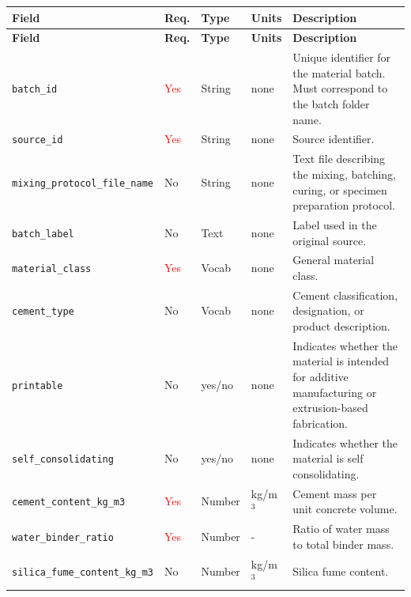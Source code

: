 \documentclass[11pt]{book}
\begin{document}
\small
\begin{longtable}{p{}p{}p{}p{}p{}}

\textbf{Field} & \textbf{Req.} & \textbf{Type} & \textbf{Units} & \textbf{Description} \\
\hline
\endfirsthead

\textbf{Field} & \textbf{Req.} & \textbf{Type} & \textbf{Units} & \textbf{Description} \\
\hline
\endhead

\texttt{batch\_id} & \textcolor{red}{Yes} & String & none & Unique identifier for the material batch. Must correspond to the batch folder name. \\

\texttt{source\_id} & \textcolor{red}{Yes} & String & none & Source identifier. \\

\texttt{mixing\_protocol\_file\_name} & No & String & none & Text file describing the mixing, batching, curing, or specimen preparation protocol. \\

\texttt{batch\_label} & No & Text & none & Label used in the original source. \\

\texttt{material\_class} & \textcolor{red}{Yes} & Vocab & none & General material class. \\

\texttt{cement\_type} & No & Vocab & none & Cement classification, designation, or product description. \\

\texttt{printable} & No & yes/no & none & Indicates whether the material is intended for additive manufacturing or extrusion-based fabrication. \\

\texttt{self\_consolidating} & No & yes/no & none & Indicates whether the material is self consolidating. \\

\texttt{cement\_content\_kg\_m3} & \textcolor{red}{Yes} & Number & kg/m$^3$ & Cement mass per unit concrete volume. \\

\texttt{water\_binder\_ratio} & \textcolor{red}{Yes} & Number & - & Ratio of water mass to total binder mass. \\

\texttt{silica\_fume\_content\_kg\_m3} & No & Number & kg/m$^3$ & Silica fume content. \\


\end{longtable}
\end{document}
